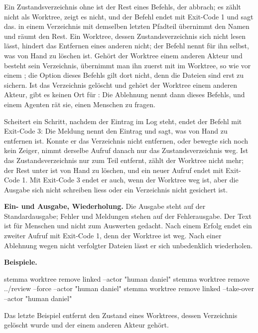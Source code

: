 Ein Zustandsverzeichnis ohne  ist der Rest eines Befehls, der abbrach; es zählt nicht
als Worktree,  zeigt es nicht, und der Befehl endet mit Exit-Code 1 und sagt
das.  in einem Verzeichnis mit demselben letzten Pfadteil übernimmt den Namen
und räumt den Rest. Ein Worktree, dessen Zustandsverzeichnis sich nicht lesen lässt, hindert das
Entfernen eines anderen nicht; der Befehl nennt für ihn selbst, was von Hand zu löschen ist.
Gehört der Worktree einem anderen Akteur und besteht sein Verzeichnis, übernimmt man ihn zuerst
mit  im Worktree, so wie vor einem ; die Option
 dieses Befehls gilt dort nicht, denn die Dateien sind erst zu sichern.
Ist das Verzeichnis gelöscht und gehört der Worktree einem anderen Akteur, gibt es keinen Ort für
: Die Ablehnung nennt dann  dieses Befehls, und einem
Agenten rät sie, einen Menschen zu fragen.

Scheitert ein Schritt, nachdem der Eintrag im Log steht, endet der Befehl mit Exit-Code 3: Die
Meldung nennt den Eintrag und sagt, was von Hand zu entfernen ist. Konnte er das Verzeichnis
nicht entfernen, oder bewegte sich noch kein Zeiger, nimmt derselbe Aufruf danach nur das
Zustandsverzeichnis weg. Ist das Zustandsverzeichnis nur zum Teil entfernt, zählt der Worktree
nicht mehr; der Rest unter  ist von Hand zu löschen, und ein neuer Aufruf
endet mit Exit-Code 1. Mit Exit-Code 3 endet er auch, wenn der Worktree weg ist, aber die Ausgabe
sich nicht schreiben liess oder ein Verzeichnis nicht gesichert ist.

{\bf Ein- und Ausgabe, Wiederholung.} Die Ausgabe steht auf der Standardausgabe; Fehler und
Meldungen stehen auf der Fehlerausgabe. Der Text ist für Menschen und nicht zum Auswerten gedacht.
Nach einem Erfolg endet ein zweiter Aufruf mit Exit-Code 1, denn der Worktree ist weg. Nach einer
Ablehnung wegen nicht verfolgter Dateien lässt er sich unbedenklich wiederholen.

{\bf Beispiele.}

\starttyping
stemma worktree remove linked --actor "human daniel"
stemma worktree remove ../review --force --actor "human daniel"
stemma worktree remove linked --take-over --actor "human daniel"
\stoptyping

Das letzte Beispiel entfernt den Zustand eines Worktrees, dessen Verzeichnis gelöscht wurde und
der einem anderen Akteur gehört.


